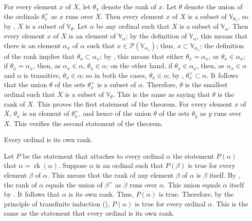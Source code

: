 \documentclass{article}
\begin{document}
For every element \(x\) of \(X\), let \(\theta_x\) denote the rank of
\(x\).  Let \(\theta\) denote the union of the ordinals \(\theta_x^+\)
as \(x\) runs over \(X\).  Then every element \(x\) of \(X\) is a
subset of \(\mathbb{V}_{\theta_x}\), so by , \(X\)
is a subset of \(\mathbb{V}_\theta\).  Let \(\alpha\) be any ordinal
such that \(X\) is a subset of \(\mathbb{V}_\alpha\).  Then every
element \(x\) of \(X\) is an element of \(\mathbb{V}_\alpha\); by the
definition of \(\mathbb{V}_\alpha\), this means that there is an
element \(\alpha_x\) of \(\alpha\) such that
\(x \in \mathcal{P}(\mathbb{V}_{\alpha_x})\); thus,
\(x \subset \mathbb{V}_{\alpha_x}\); the definition of the rank
implies that \(\theta_x \subset \alpha_x\); by ,
this means that either \(\theta_x = \alpha_x\), or
\(\theta_x \in \alpha_x\); if \(\theta_x = \alpha_x\), then, as
\(\alpha_x \in \alpha\), \(\theta_x \in \alpha\); on the other hand,
if \(\theta_x \in \alpha_x\), then, as \(\alpha_x \in \alpha\) and
\(\alpha\) is transitive, \(\theta_x \in \alpha\); so in both the
cases, \(\theta_x \in \alpha\); by ,
\(\theta_x^+ \subset \alpha\).  It follows that the union \(\theta\)
of the sets \(\theta_x^+\) is a subset of \(\alpha\).  Therefore,
\(\theta\) is the smallest ordinal such that \(X\) is a subset of
\(\mathbb{V}_\theta\).  This is the same as saying that \(\theta\) is
the rank of \(X\).  This proves the first statement of the theorem.
For every element \(x\) of \(X\), \(\theta_x\) is an element of
\(\theta_x^+\), and hence of the union \(\theta\) of the sets
\(\theta_y\) as \(y\) runs over \(X\).  This verifies the second
statement of the theorem.

\begin{theorem}
  \label{thm:dqbi8lx3}
  Every ordinal is its own rank.
\end{theorem}

Let \(P\) be the statement that attaches to every ordinal \(\alpha\)
the statement \(P(\alpha)\) that
\(\alpha = \operatorname{rk}(\alpha)\).  Suppose \(\alpha\) is an
ordinal such that \(P(\beta)\) is true for every element \(\beta\) of
\(\alpha\).  This means that the rank of any element \(\beta\) of
\(\alpha\) is \(\beta\) itself.  By , the rank of
\(\alpha\) equals the union of \(\beta^+\) as \(\beta\) runs over
\(\alpha\).  This union equals \(\alpha\) itself by
.  It follows that \(\alpha\) is its own rank.
Thus, \(P(\alpha)\) is true.  Therefore, by the principle of
transfinite induction (), \(P(\alpha)\) is true for
every ordinal \(\alpha\).  This is the same as the statement that
every ordinal is its own rank.
\end{document}
